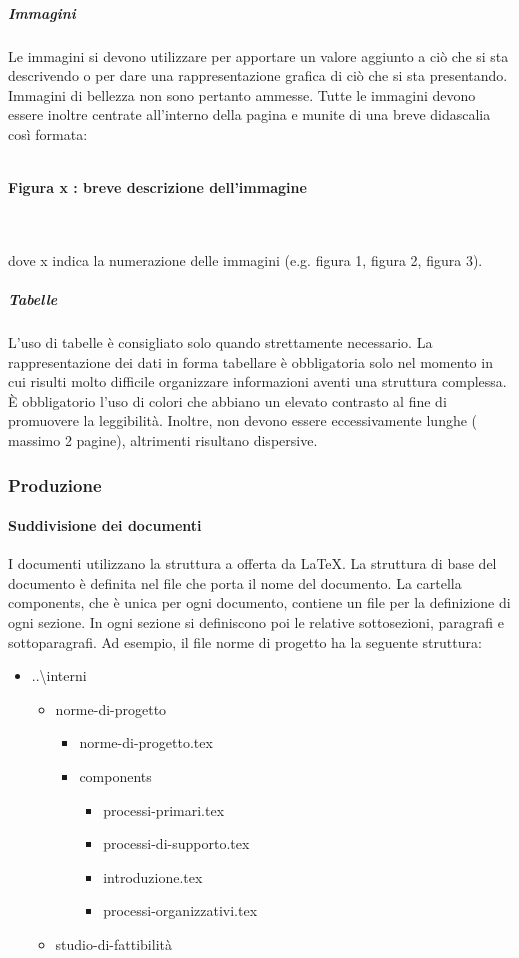 \documentclass[../norme-di-progetto.tex]{subfiles}
\begin{document}
\subparagraph{Immagini}%
\label{subp:immagini}
Le immagini si devono utilizzare per apportare un valore aggiunto a ciò che si sta descrivendo o per dare una rappresentazione grafica di ciò che si sta presentando.
Immagini di bellezza non sono pertanto ammesse.
Tutte le immagini devono essere inoltre centrate all'interno della pagina e munite di una breve didascalia così formata: \\\\\centerline{\textbf{Figura x : breve descrizione dell'immagine}} \\\\ dove x indica la numerazione delle immagini (e.g. figura 1, figura 2, figura 3).

\subparagraph{Tabelle}%
\label{subp:tabelle}
L'uso di tabelle è consigliato solo quando strettamente necessario. La rappresentazione dei dati in forma tabellare è obbligatoria solo nel momento in cui risulti molto difficile organizzare informazioni aventi una struttura complessa. È obbligatorio l'uso di colori che abbiano un elevato contrasto al fine di promuovere la leggibilità. Inoltre, non devono essere eccessivamente lunghe ( massimo 2 pagine), altrimenti risultano dispersive.

\subsubsection{Produzione}

\paragraph{Suddivisione dei documenti}%
\label{par:suddivisione dei documenti}
I documenti utilizzano la struttura a  offerta da \LaTeX.
La struttura di base del documento è definita nel file che porta il nome del documento.
La cartella components, che è unica per ogni documento, contiene un file per la definizione di ogni sezione. In ogni sezione si definiscono poi le relative sottosezioni, paragrafi e sottoparagrafi.
Ad esempio, il file norme di progetto ha la seguente struttura:

\begin{itemize}
  \item ..\textbackslash interni
  \begin{itemize}
  \item norme-di-progetto
     \begin{itemize}
       \item norme-di-progetto.tex
       \item components
       \begin{itemize}
         \item processi-primari.tex
         \item processi-di-supporto.tex
         \item introduzione.tex
         \item processi-organizzativi.tex
       \end{itemize}
     \end{itemize}
  \item studio-di-fattibilità
  \end{itemize}
\end{itemize}
\end{document}
